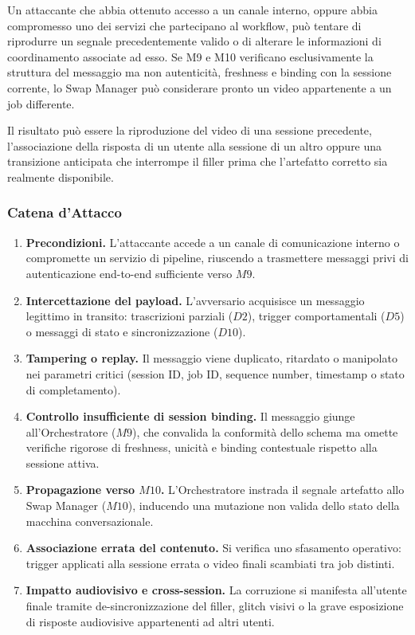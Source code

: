 \documentclass[11pt,a4paper]{article}
\begin{document}
Un attaccante che abbia ottenuto accesso a un canale interno, oppure
abbia compromesso uno dei servizi che partecipano al workflow, può
tentare di riprodurre un segnale precedentemente valido o di alterare
le informazioni di coordinamento associate ad esso. Se M9 e M10
verificano esclusivamente la struttura del messaggio ma non
autenticità, freshness e binding con la sessione corrente, lo Swap
Manager può considerare pronto un video appartenente a un job
differente.

Il risultato può essere la riproduzione del video di una sessione
precedente, l'associazione della risposta di un utente alla sessione di
un altro oppure una transizione anticipata che interrompe il filler
prima che l'artefatto corretto sia realmente disponibile.

\subsubsection{Catena d'Attacco}

\begin{enumerate}
    \item \textbf{Precondizioni.} L'attaccante accede a un canale di comunicazione interno o compromette un servizio di pipeline, riuscendo a trasmettere messaggi privi di autenticazione end-to-end sufficiente verso $M9$.

    \item \textbf{Intercettazione del payload.} L'avversario acquisisce un messaggio legittimo in transito: trascrizioni parziali ($D2$), trigger comportamentali ($D5$) o messaggi di stato e sincronizzazione ($D10$).

    \item \textbf{Tampering o replay.} Il messaggio viene duplicato, ritardato o manipolato nei parametri critici (session ID, job ID, sequence number, timestamp o stato di completamento).

    \item \textbf{Controllo insufficiente di session binding.} Il messaggio giunge all'Orchestratore ($M9$), che convalida la conformità dello schema ma omette verifiche rigorose di freshness, unicità e binding contestuale rispetto alla sessione attiva.

    \item \textbf{Propagazione verso $M10$.} L'Orchestratore instrada il segnale artefatto allo Swap Manager ($M10$), inducendo una mutazione non valida dello stato della macchina conversazionale.

    \item \textbf{Associazione errata del contenuto.} Si verifica uno sfasamento operativo: trigger applicati alla sessione errata o video finali scambiati tra job distinti.

    \item \textbf{Impatto audiovisivo e cross-session.} La corruzione si manifesta all'utente finale tramite de-sincronizzazione del filler, glitch visivi o la grave esposizione di risposte audiovisive appartenenti ad altri utenti.
\end{enumerate}
\end{document}

